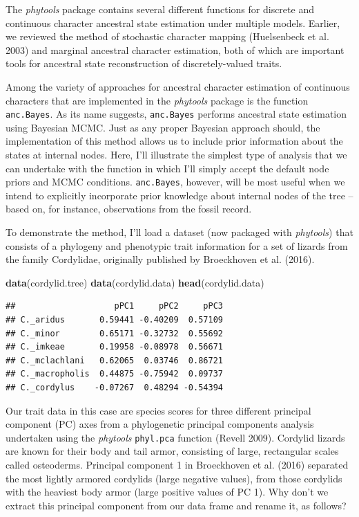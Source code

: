 \documentclass[fleqn,10pt,lineno]{wlpeerj} %
\newenvironment{Shaded}{\begin{snugshade}}{\end{snugshade}}
\newcommand{\FunctionTok}[1]{\textcolor[rgb]{0.13,0.29,0.53}{\textbf{#1}}}
\newcommand{\NormalTok}[1]{#1}
\begin{document}
The \emph{phytools} package contains several different functions for discrete and continuous character ancestral state estimation under multiple models. Earlier, we reviewed the method of stochastic character mapping (Huelsenbeck et al. 2003) and marginal ancestral character estimation, both of which are important tools for ancestral state reconstruction of discretely-valued traits.

Among the variety of approaches for ancestral character estimation of continuous characters that are implemented in the \emph{phytools} package is the function \texttt{anc.Bayes}. As its name suggests, \texttt{anc.Bayes} performs ancestral state estimation using Bayesian MCMC. Just as any proper Bayesian approach should, the implementation of this method allows us to include prior information about the states at internal nodes. Here, I'll illustrate the simplest type of analysis that we can undertake with the function in which I'll simply accept the default node priors and MCMC conditions. \texttt{anc.Bayes}, however, will be most useful when we intend to explicitly incorporate prior knowledge about internal nodes of the tree -- based on, for instance, observations from the fossil record.

To demonstrate the method, I'll load a dataset (now packaged with \emph{phytools}) that consists of a phylogeny and phenotypic trait information for a set of lizards from the family Cordylidae, originally published by Broeckhoven et al. (2016).

\begin{Shaded}
\begin{Highlighting}[]
\FunctionTok{data}\NormalTok{(cordylid.tree)}
\FunctionTok{data}\NormalTok{(cordylid.data)}
\FunctionTok{head}\NormalTok{(cordylid.data)}
\end{Highlighting}
\end{Shaded}

\begin{verbatim}
##                    pPC1     pPC2     pPC3
## C._aridus       0.59441 -0.40209  0.57109
## C._minor        0.65171 -0.32732  0.55692
## C._imkeae       0.19958 -0.08978  0.56671
## C._mclachlani   0.62065  0.03746  0.86721
## C._macropholis  0.44875 -0.75942  0.09737
## C._cordylus    -0.07267  0.48294 -0.54394
\end{verbatim}

Our trait data in this case are species scores for three different principal component (PC) axes from a phylogenetic principal components analysis undertaken using the \emph{phytools} \texttt{phyl.pca} function (Revell 2009). Cordylid lizards are known for their body and tail armor, consisting of large, rectangular scales called osteoderms. Principal component 1 in Broeckhoven et al. (2016) separated the most lightly armored cordylids (large negative values), from those cordylids with the heaviest body armor (large positive values of PC 1). Why don't we extract this principal component from our data frame and rename it, as follows?
\end{document}
